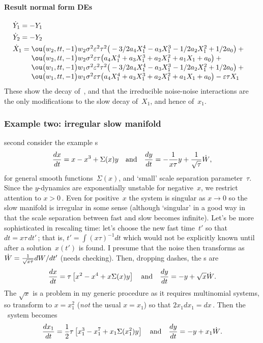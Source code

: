 \paragraph{Result normal form DEs}
\begin{align*}&
\dot Y_{1}=-Y_{1}
\\&
\dot Y_{2}=-Y_{2}
\\&
\dot X_{1}=\ParMath{ \ou\big(w_{2},tt,-1\big) w_{2} \sigma ^{2} \eps^{2} \tau ^{2}
 \big(-3/2 a_{4} X_{1}^{4}-a_{3} X_{1}^{3}-1/2 a_{2} X_{1}^{2}+1/2 a_{0}
\big)+\ou\big(w_{2},tt,-1\big) w_{2} \sigma ^{2} \eps \tau  \big(a_{4} X
_{1}^{4}+a_{3} X_{1}^{3}+a_{2} X_{1}^{2}+a_{1} X_{1}+a_{0}\big)+\ou\big(
w_{1},tt,-1\big) w_{1} \sigma ^{2} \eps^{2} \tau ^{2} \big(-3/2 a_{4} X_
{1}^{4}-a_{3} X_{1}^{3}-1/2 a_{2} X_{1}^{2}+1/2 a_{0}\big)+\ou\big(w_{1}
,tt,-1\big) w_{1} \sigma ^{2} \eps \tau  \big(a_{4} X_{1}^{4}+a_{3} X_{1
}^{3}+a_{2} X_{1}^{2}+a_{1} X_{1}+a_{0}\big)-\eps \tau  X_{1}
}
\end{align*}
These show the decay of~\Yv, and that the irreducible noise-noise interactions are the only modifications to the slow decay of~\(X_1\), and hence of~\(x_1\).




\subsubsection{Example two: irregular slow manifold}

\cite{Monahan2011} second consider the example \sde{}s
\begin{equation*}
\de tx=x-x^3+\Sigma(x)y \qtq{and}
\de ty=-\frac1{x\tau} y+\frac1{\sqrt\tau}\dot W,
\end{equation*}
for general smooth functions~$\Sigma(x)$, and `small' scale separation parameter~\(\tau\).
Since the $y$-dynamics are exponentially unstable for negative~$x$, we restrict attention to $x>0$\,.
Even for positive~$x$ the system is singular as $x\to0$ so the slow manifold is irregular in some sense (although `singular' in a good way in that the scale separation between fast and slow becomes infinite).
Let's be more sophisticated in rescaling time: let's choose the new fast time~$t'$ so that $dt=x\tau\, dt'$\,; that is, $t'=\int (x\tau)^{-1}dt$ which would not be explicitly known until after a solution~$x(t')$ is found.
I presume that the noise then transforms as $\dot W=\frac1{\sqrt{x\tau}}\de {t'}W$ (needs checking).
Then, dropping dashes, the \sde{}s are
\begin{equation*}
\de tx=\tau \left[x^2-x^4+x\Sigma(x)y\right]
\qtq{and}
\de ty=- y+\sqrt x\dot W.
\end{equation*}
The $\sqrt x$ is a problem in my generic procedure as it requires multinomial systems, so transform to $x=x_1^2$ (\emph{not} the usual \(x=x_1\)) so that $2x_1dx_1=dx$\,.
Then the \sde\ system becomes
\begin{equation*}
\de t{x_1}=\frac12\tau \left[x_1^3-x_1^7+x_1\Sigma(x_1^2)y\right]
\qtq{and}
\de ty=- y+x_1\dot W.
\end{equation*}

